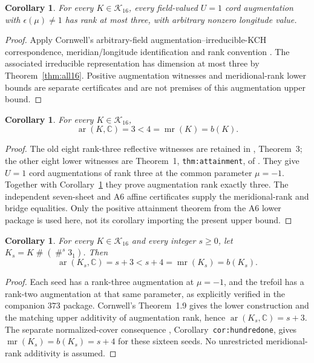 \documentclass[11pt]{article}
\newtheorem{corollary}[theorem]{Corollary}
\newcommand{\mr}{\operatorname{mr}}
\begin{document}
\begin{corollary}\label{cor:augmentation}
For every $K\in\mathcal K_{16}$, every field-valued $U=1$ cord
augmentation with $\epsilon(\mu)\ne1$ has rank at most three, with
arbitrary nonzero longitude value.
\end{corollary}
\begin{proof}
Apply Cornwell's arbitrary-field augmentation--irreducible-KCH
correspondence, meridian/longitude identification and rank convention
\cite[Theorem 1.2, Definition 1.8, Proposition 2.12 and Lemma 3.14]{cor17}.
The associated irreducible representation has dimension at most three
by Theorem~\ref{thm:all16}.
Positive augmentation witnesses and meridional-rank lower bounds are
separate certificates and are not premises of this augmentation upper bound.
\end{proof}

\begin{corollary}\label{cor:gap}
For every $K\in\mathcal K_{16}$,
\[
              \operatorname{ar}(K,\mathbb C)=3<4=\mr(K)=b(K).
\]
\end{corollary}
\begin{proof}
The old eight rank-three reflective witnesses are retained in
, Theorem~3; the other
eight lower witnesses are Theorem~1, \texttt{thm:attainment}, of
. They give $U=1$ cord
augmentations of rank three at the common parameter $\mu=-1$.
Together with Corollary~\ref{cor:augmentation} they prove augmentation
rank exactly three. The independent seven-sheet and A6 affine
certificates supply the meridional-rank and bridge equalities.
Only the positive attainment theorem from the A6 lower package is
used here, not its corollary importing the present upper bound.
\end{proof}

\begin{corollary}\label{cor:sums}
For every $K\in\mathcal K_{16}$ and every integer $s\ge0$, let
$K_s=K\mathbin{\#}(\mathbin{\#}^{s}3_1)$. Then
\[
          \operatorname{ar}(K_s,\mathbb C)=s+3<s+4=\mr(K_s)=b(K_s).
\]
\end{corollary}
\begin{proof}
Each seed has a rank-three augmentation at $\mu=-1$, and the trefoil
has a rank-two augmentation at that same parameter, as explicitly
verified in the companion $373$ package. Cornwell's Theorem~1.9 gives
the lower construction and the matching upper additivity of
augmentation rank, hence $\operatorname{ar}(K_s,\mathbb C)=s+3$.
The separate normalized-cover consequence
,
Corollary~\texttt{cor:hundredone}, gives $\mr(K_s)=b(K_s)=s+4$ for
these sixteen seeds. No unrestricted meridional-rank additivity is
assumed.
\end{proof}
\end{document}

